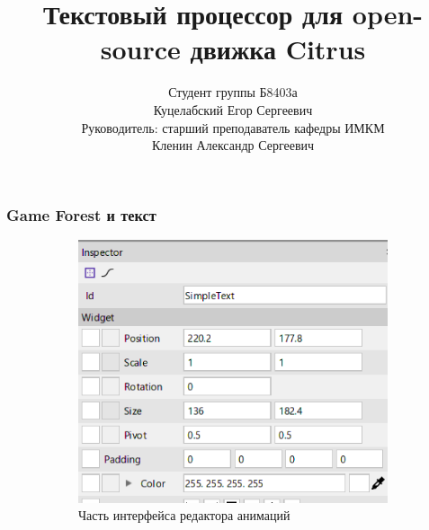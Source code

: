 \documentclass[10pt, unicode]{beamer}
\title{Текстовый процессор для open-source движка Citrus}
\author{Студент группы Б8403а\\Куцелабский Егор Сергеевич\\Руководитель: старший 
преподаватель кафедры ИМКМ\\Кленин Александр Сергеевич}
\date{}
\begin{document}
    \begin{frame}
        \titlepage
        \thispagestyle{empty}
    \end{frame}
    \begin{frame}
        \frametitle{Game Forest и текст}
        \begin{figure}[h]
            \centering
            \begin{subfigure}[h]{0.59\textwidth}
                \includegraphics[width=\textwidth]{images/TangerineInterface.png}
                \caption{Часть интерфейса редактора анимаций}
            \end{subfigure}
            \begin{subfigure}[h]{0.4\textwidth}

\end{subfigure}
\end{figure}
\end{frame}
\end{document}
